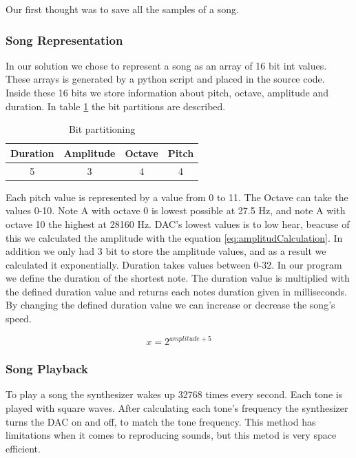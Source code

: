 Our first thought was to save all the samples of a song. 

\subsubsection{Song Representation}
In our solution we chose to represent a song as an array of 16 bit int values. These arrays is generated by a python script and placed in the source code. Inside these 16 bits we store information about pitch, octave, amplitude and duration. In table \ref{tab:bitFields} the bit partitions are described.

\begin{table}[H]
	\begin{center}
	\begin{tabular}{ |c|c|c|c| }
	  \hline
	  Duration & Amplitude & Octave & Pitch \\
	  \hline
	  5 & 3 & 4 & 4 \\
	  \hline

	\end{tabular}
	\caption{Bit partitioning}
	\label{tab:bitFields}
	\end{center}
\end{table}

Each pitch value is represented by a value from 0 to 11. The Octave can take the values 0-10. Note A with octave 0 is lowest possible at 27.5 Hz, and note A with octave 10 the highest at 28160 Hz. DAC's lowest values is to low hear, beacuse of this we calculated the amplitude with the equation \ref{eq:amplitudCalculation}. In addition we only had 3 bit to store the amplitude values, and as a result we calculated it exponentially. Duration takes values between 0-32. In our program we define the duration of the shortest note. The duration value is multiplied with the defined duration value and returns each notes duration given in milliseconds. By changing the defined duration value we can increase or decrease the song's speed.

\begin{equation}
  x = 2^{amplitude + 5}
  \label{eq:amplitudCalculation}
\end{equation}

\subsubsection{Song Playback}
To play a song the synthesizer wakes up 32768 times every second. Each tone is played with square waves. After calculating each tone's frequency the synthesizer turns the DAC on and off, to match the tone frequency. This method has limitations when it comes to reproducing sounds, but this metod is very space efficient.


